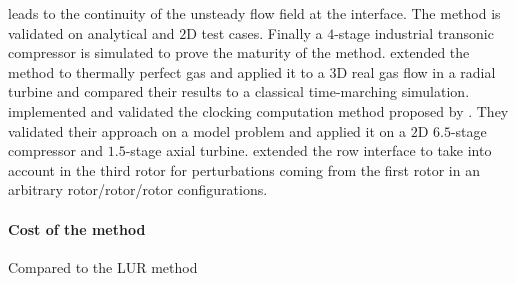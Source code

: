 leads to the continuity of the unsteady flow field at the interface.
The method is validated on analytical and $2$D test cases. Finally
a $4$-stage industrial transonic compressor is simulated to prove the 
maturity of the method.
\citet{Vilmin2007} extended the method to thermally perfect gas and
applied it to a $3$D real gas flow in a radial turbine and compared their
results to a classical time-marching simulation.
\citet{Vilmin2009} implemented and validated the clocking computation method
proposed by \citet{He2002}. They validated their approach on a model problem
and applied it
on a $2$D $6.5$-stage compressor and $1.5$-stage axial turbine.
\citet{Vilmin2013a} extended the row interface to take into
account in the third rotor for perturbations 
coming from the first rotor in an
arbitrary rotor/rotor/rotor configurations.

\paragraph{Cost of the method}
Compared to the LUR method